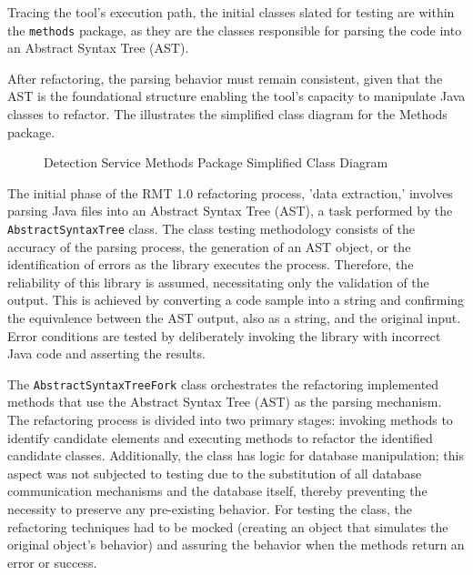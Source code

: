 Tracing the tool's execution path, the initial classes slated for testing are within the \texttt{methods} package, as they are the classes responsible for parsing the code into an Abstract Syntax Tree (AST). 

After refactoring, the parsing behavior must remain consistent, given that the AST is the foundational structure enabling the tool's capacity to manipulate Java classes to refactor. The  illustrates the simplified class diagram for the Methods package.

\begin{figure}[ht!]
\SetCaptionWidth{\textwidth}
\caption{Detection Service Methods Package Simplified Class Diagram}
\label{fig-class-detection-methods}
\fontsize{7}{8}\selectfont

\end{figure}
\FloatBarrier

The initial phase of the RMT 1.0 refactoring process, 'data extraction,' involves parsing Java files into an Abstract Syntax Tree (AST), a task performed by the \texttt{AbstractSyntaxTree} class. The class testing methodology consists of the accuracy of the parsing process, the generation of an AST object, or the identification of errors as the library \cite{javaparser} executes the process. Therefore, the reliability of this library is assumed, necessitating only the validation of the output. This is achieved by converting a code sample into a string and confirming the equivalence between the AST output, also as a string, and the original input. Error conditions are tested by deliberately invoking the library with incorrect Java code and asserting the results.

The \texttt{AbstractSyntaxTreeFork} class orchestrates the refactoring implemented methods that use the Abstract Syntax Tree (AST) as the parsing mechanism. The refactoring process is divided into two primary stages: invoking methods to identify candidate elements and executing methods to refactor the identified candidate classes. Additionally, the class has logic for database manipulation; this aspect was not subjected to testing due to the substitution of all database communication mechanisms and the database itself, thereby preventing the necessity to preserve any pre-existing behavior. For testing the class, the refactoring techniques had to be mocked (creating an object that simulates the original object's behavior) and assuring the behavior when the methods return an error or success.


